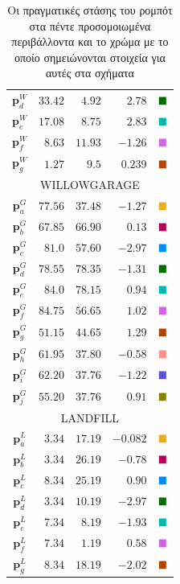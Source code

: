 \begin{table}
\begin{tabular} {c|rrrc}
    $\bm{p}_d^W$   & $33.42$   & $4.92$    & $2.78$          & $\squared$ \\
    $\bm{p}_e^W$   & $17.08$   & $8.75$    & $2.83$          & $\squaree$ \\
    $\bm{p}_f^W$   & $8.63$    & $11.93$   & $-1.26$         & $\squaref$ \\
    $\bm{p}_g^W$   & $1.27$    & $9.5$     & $0.239$         & $\squareg$ \\ \midrule
    \multicolumn{5}{c}{WILLOWGARAGE}                                      \\ \midrule
    $\bm{p}_a^G$   & $77.56$   & $37.48$   & $-1.27$         & $\squarea$ \\
    $\bm{p}_b^G$   & $67.85$   & $66.90$   & $0.13$          & $\squareb$ \\
    $\bm{p}_c^G$   & $81.0$    & $57.60$   & $-2.97$         & $\squarec$ \\
    $\bm{p}_d^G$   & $78.55$   & $78.35$   & $-1.31$         & $\squared$ \\
    $\bm{p}_e^G$   & $84.0$    & $78.15$   & $0.94$          & $\squaree$ \\
    $\bm{p}_f^G$   & $84.75$   & $56.65$   & $1.02$          & $\squaref$ \\
    $\bm{p}_g^G$   & $51.15$   & $44.65$   & $1.29$          & $\squareg$ \\
    $\bm{p}_h^G$   & $61.95$   & $37.80$   & $-0.58$         & $\squareh$ \\
    $\bm{p}_i^G$   & $62.20$   & $37.76$   & $-1.22$         & $\squarei$ \\
    $\bm{p}_j^G$   & $55.20$   & $37.76$   & $0.91$          & $\squarej$ \\ \midrule
    \multicolumn{5}{c}{LANDFILL}                                          \\ \midrule
    $\bm{p}_a^L$   & $3.34$    & $17.19$   & $-0.082$        & $\squarea$ \\
    $\bm{p}_b^L$   & $3.34$    & $26.19$   & $-0.78$         & $\squareb$ \\
    $\bm{p}_c^L$   & $8.34$    & $25.19$   & $0.90$          & $\squarec$ \\
    $\bm{p}_d^L$   & $3.34$    & $10.19$   & $-2.97$         & $\squared$ \\
    $\bm{p}_e^L$   & $7.34$    & $8.19$    & $-1.93$         & $\squaree$ \\
    $\bm{p}_f^L$   & $7.34$    & $1.19$    & $0.58$          & $\squaref$ \\
    $\bm{p}_g^L$   & $8.34$    & $18.19$   & $-2.02$         & $\squareg$ \\ \bottomrule
  \end{tabular}
  \caption{\small Οι πραγματικές στάσης του ρομπότ στα πέντε προσομοιωμένα
           περιβάλλοντα και το χρώμα με το οποίο σημειώνονται στοιχεία για
           αυτές στα σχήματα}
  \label{tbl:02_03_04:true_poses_simulation}
\end{table}

